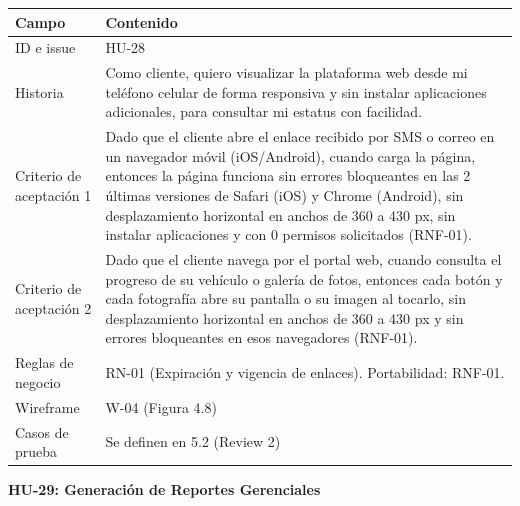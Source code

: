 {\def\LTcaptype{none} %
\begin{longtable}[]{@{}
  >{\raggedright\arraybackslash}p{}
  >{\raggedright\arraybackslash}p{}@{}}
\toprule\noalign{}
\begin{minipage}[b]{\linewidth}\raggedright
\textbf{Campo}
\end{minipage} & \begin{minipage}[b]{\linewidth}\raggedright
\textbf{Contenido}
\end{minipage} \\
\midrule\noalign{}
\endhead
\bottomrule\noalign{}
\endlastfoot
ID e issue & HU-28 \\
Historia & Como cliente, quiero visualizar la plataforma web desde mi
teléfono celular de forma responsiva y sin instalar aplicaciones
adicionales, para consultar mi estatus con facilidad. \\
Criterio de aceptación 1 & Dado que el cliente abre el enlace recibido
por SMS o correo en un navegador móvil (iOS/Android), cuando carga la
página, entonces la página funciona sin errores bloqueantes en las 2
últimas versiones de Safari (iOS) y Chrome (Android), sin desplazamiento
horizontal en anchos de 360 a 430 px, sin instalar aplicaciones y con 0
permisos solicitados (RNF-01). \\
Criterio de aceptación 2 & Dado que el cliente navega por el portal web,
cuando consulta el progreso de su vehículo o galería de fotos, entonces
cada botón y cada fotografía abre su pantalla o su imagen al tocarlo,
sin desplazamiento horizontal en anchos de 360 a 430 px y sin errores
bloqueantes en esos navegadores (RNF-01). \\
Reglas de negocio & RN-01 (Expiración y vigencia de enlaces).
Portabilidad: RNF-01. \\
Wireframe & W-04 (Figura 4.8) \\
Casos de prueba & Se definen en 5.2 (Review 2) \\
\end{longtable}
}

\textbf{HU-29: Generación de Reportes Gerenciales}

